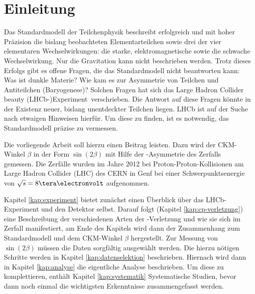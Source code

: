 \chapter{Einleitung}
Das Standardmodell der Teilchenphysik beschreibt erfolgreich und mit hoher Präzision die bislang beobachteten Elementarteilchen sowie drei der vier elementaren Wechselwirkungen: die starke, elektromagnetische sowie die schwache Wechselwirkung. Nur die Gravitation kann nicht beschrieben werden. Trotz dieses Erfolgs gibt es offene Fragen, die das Standardmodell nicht beantworten kann: Was ist dunkle Materie? Wie kam es zur Asymmetrie von Teilchen und Antiteilchen (Baryogenese)? Solchen Fragen hat sich das \glqq Large Hadron Collider beauty (LHCb-)Experiment\grqq\ verschrieben. Die Antwort auf diese Fragen könnte in der Existenz neuer, bislang unentdeckter Teilchen liegen. LHCb ist auf der Suche nach etwaigen Hinweisen hierfür.  Um diese zu finden, ist es notwendig, das Standardmodell präzise zu vermessen. \cite{cern-courier, roadmap}

Die vorliegende Arbeit soll hierzu einen Beitrag leisten. Dazu wird der CKM-Winkel $\beta$ in der Form $\sin(2\beta)$ mit Hilfe der \CP-Asymmetrie des Zerfalls \Decaychannel gemessen. Die Zerfälle wurden im Jahre 2012 bei Proton-Proton-Kollisionen am Large Hadron Collider (LHC) des CERN in Genf bei einer Schwerpunktsenergie von $\sqrt{s}=8\tera\electronvolt$ aufgenommen.

Kapitel \ref{kap:experiment} bietet zunächst einen Überblick über das LHCb-Experiment und den Detektor selbst. Darauf folgt (Kapitel \ref{kap:cp-verletzung}) eine Beschreibung der verschiedenen Arten der \CP-Verletzung und wie sie sich im Zerfall \Decaychannel manifestiert, am Ende des Kapitels wird dann der Zusammenhang zum Standardmodell und dem CKM-Winkel $\beta$ hergestellt. Zur Messung von $\sin(2\beta)$ müssen die Daten sorgfältig ausgewählt werden. Die hierzu nötigen Schritte werden in Kapitel \ref{kap:datenselektion} beschrieben. Hiernach wird dann in Kapitel \ref{kap:analyse} die eigentliche Analyse beschrieben. Um diese zu komplettieren, enthält Kapitel \ref{kap:systematik} Systematische Studien, bevor dann noch einmal die wichtigsten Erkenntnisse zusammengefasst werden.